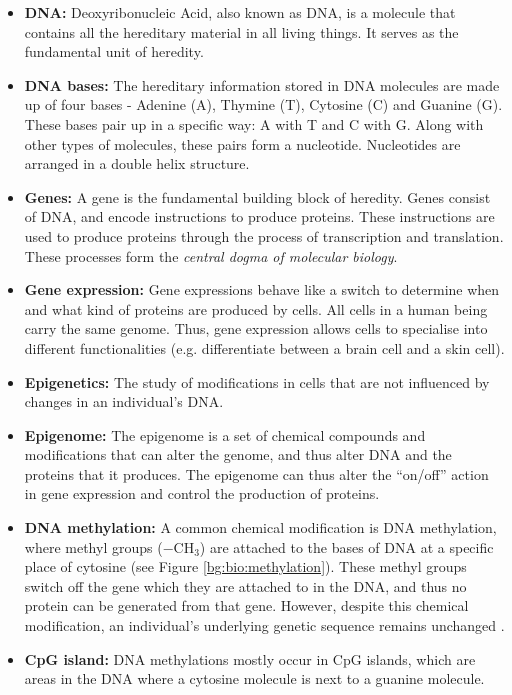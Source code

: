 \documentclass[12pt, twoside, a4paper]{report}
\begin{document}
\begin{itemize}
\item \textbf{DNA:} Deoxyribonucleic Acid, also known as DNA, is a molecule that contains all the hereditary material in all living things. It serves as the fundamental unit of heredity.

\item \textbf{DNA bases:} The hereditary information stored in DNA molecules are made up of four bases - Adenine (A), Thymine (T), Cytosine (C) and Guanine (G). These bases pair up in a specific way: A with T and C with G. Along with other types of molecules, these pairs form a nucleotide. Nucleotides are arranged in a double helix structure.

\item \textbf{Genes:} A gene is the fundamental building block of heredity. Genes consist of DNA, and encode instructions to produce proteins. These instructions are used to produce proteins through the process of transcription and translation. These processes form the \textit{central dogma of molecular biology}.

\item \textbf{Gene expression:} Gene expressions behave like a switch to determine when and what kind of proteins are produced by cells. All cells in a human being carry the same genome. Thus, gene expression allows cells to specialise into different functionalities (e.g. differentiate between a brain cell and a skin cell).

\item \textbf{Epigenetics:} The study of modifications in cells that are not influenced by changes in an individual's DNA.

\item \textbf{Epigenome:} The epigenome is a set of chemical compounds and modifications that can alter the genome, and thus alter DNA and the proteins that it produces. The epigenome can thus alter the ``on/off'' action in gene expression and control the production of proteins.


\item \textbf{DNA methylation:} A common chemical modification is DNA methylation, where methyl groups ($-$CH$_3$) are attached to the bases of DNA at a specific place of cytosine (see Figure \ref{bg:bio:methylation}). These methyl groups switch off the gene which they are attached to in the DNA, and thus no protein can be generated from that gene. However, despite this chemical modification, an individual's underlying genetic sequence remains unchanged \cite{RefWorks:249}.

\item \textbf{CpG island:} DNA methylations mostly occur in CpG islands, which are areas in the DNA where a cytosine molecule is next to a guanine molecule. 
\end{itemize}
\end{document}
